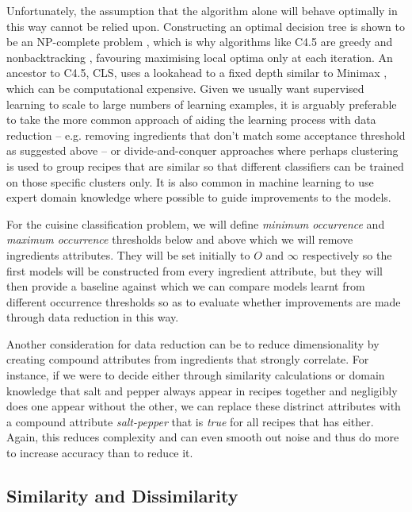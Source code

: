 \documentclass[11pt,a4paper]{article}
\begin{document}
Unfortunately, the assumption that the algorithm alone will behave optimally in this
way cannot be relied upon. Constructing an optimal decision tree is shown to be
an NP-complete problem \cite{hyafil1976constructing}, which is why algorithms
like C4.5 are greedy and nonbacktracking \cite{quinlan1993c4}, favouring
maximising local optima only at each iteration. An ancestor to C4.5, CLS,
uses a lookahead to a fixed depth similar to Minimax \cite{quinlan1986induction},
which can be computational expensive. Given we usually want supervised
learning to scale to large numbers of learning examples, it is arguably preferable
to take the more common approach of aiding the learning process with
data reduction -- e.g. removing ingredients that don't match some acceptance threshold
as suggested above -- or divide-and-conquer approaches where perhaps clustering is
used to group recipes that are similar so that different classifiers can be
trained on those specific clusters only. It is also common in machine learning
to use expert domain knowledge where possible to guide improvements to the
models.

For the cuisine classification problem, we will define \emph{minimum occurrence}
and \emph{maximum occurrence} thresholds below and above which we will remove
ingredients attributes. They will be set initially to $O$ and $\infty$
respectively so the first models will be constructed from every ingredient
attribute, but they will then provide a baseline against which we can compare
models learnt from different occurrence thresholds so as to evaluate whether
improvements are made through data reduction in this way.

Another consideration for data reduction can be to reduce dimensionality by creating
compound attributes from ingredients that strongly correlate. For instance, if
we were to decide either through similarity calculations or domain knowledge
that salt and pepper always appear in recipes together and negligibly does
one appear without the other, we can replace these distrinct attributes with a compound
attribute \emph{salt-pepper} that is \emph{true} for all recipes that has either.
Again, this reduces complexity and can even smooth out noise \cite{han2006data} and
thus do more to increase accuracy than to reduce it.

\subsection{Similarity and Dissimilarity}
\end{document}
